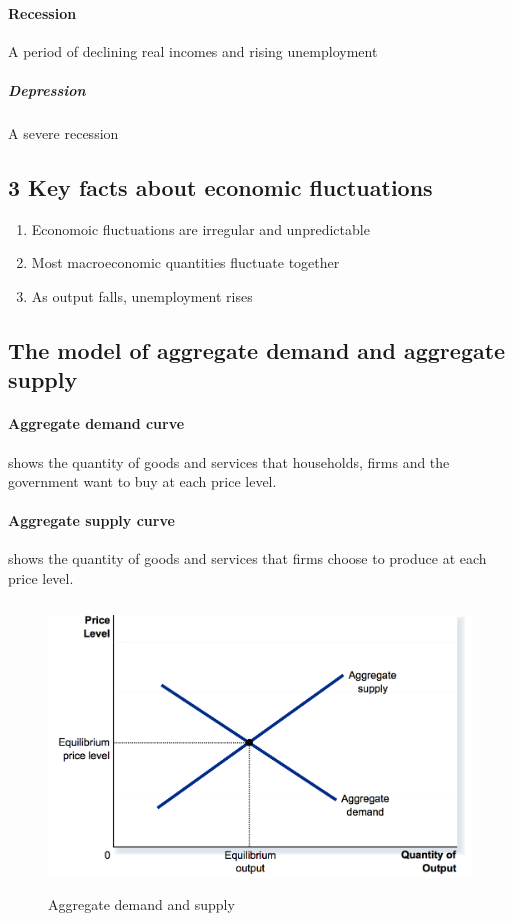 \documentclass[a4paper,titlepage] {scrartcl}
\begin{document}
\paragraph{Recession} %
\label{par:recession}
A period of declining real incomes and rising unemployment

\subparagraph{Depression} %
\label{subp:depression}
A severe recession


\subsection{3 Key facts about economic fluctuations}
\begin{enumerate}
	\item Economoic fluctuations are irregular and unpredictable
	\item Most macroeconomic quantities fluctuate together
	\item As output falls, unemployment rises
\end{enumerate}

\subsection{The model of aggregate demand and aggregate supply}
\paragraph{Aggregate demand curve} %
\label{par:aggregate_demand_curve}
shows the quantity of goods and services that households, firms and the government want to buy at each price level.

\paragraph{Aggregate supply curve} %
\label{par:aggregate_supply_curve}
shows the quantity of goods and services that firms choose to produce at each price level.
\begin{figure}[htbp]
	\centering
		\includegraphics[height=3in]{images/aggregatemodel.png}
	\caption{Aggregate demand and supply}
	\label{fig:images_realeqinopeneco}
\end{figure}
\end{document}
